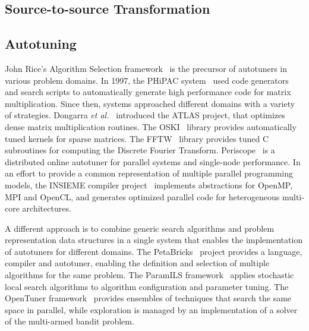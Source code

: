 \documentclass[conference]{IEEEtran}
\begin{document}
\subsection{Source-to-source Transformation}
\label{sec:org83a221d}
\subsection{Autotuning}
\label{sec:org7f1431b}
John Rice's Algorithm Selection framework~\cite{rice1976algorithm} is the
precursor of autotuners in various problem domains. In 1997, the PHiPAC
system~\cite{bilmes1997optimizing} used code generators and search scripts
to automatically generate high performance code for matrix multiplication. Since
then, systems approached different domains with a variety of strategies.
Dongarra \emph{et al.}~\cite{dongarra1998automatically} introduced the ATLAS
project, that optimizes dense matrix multiplication routines. The
OSKI~\cite{vuduc2005oski} library provides automatically tuned kernels for
sparse matrices. The FFTW~\cite{frigo1998fftw} library provides tuned C
subroutines for computing the Discrete Fourier Transform.
Periscope~\cite{gerndt2010automatic} is a distributed online autotuner for
parallel systems and single-node performance. In an effort to provide a common
representation of multiple parallel programming models, the INSIEME compiler
project~\cite{jordan2012multi} implements abstractions for OpenMP, MPI and
OpenCL, and generates optimized parallel code for heterogeneous multi-core
architectures.

A different approach is to combine generic search algorithms and problem
representation data structures in a single system that enables the
implementation of autotuners for different domains. The
PetaBricks~\cite{ansel2009petabricks} project provides a language,
compiler and autotuner, enabling the definition and selection of multiple
algorithms for the same problem. The ParamILS
framework~\cite{hutter2009paramils} applies stochastic local search
algorithms to algorithm configuration and parameter tuning. The OpenTuner
framework~\cite{ansel2014opentuner} provides ensembles of techniques that
search the same space in parallel, while exploration is managed by an
implementation of a solver of the multi-armed bandit problem.
\end{document}
